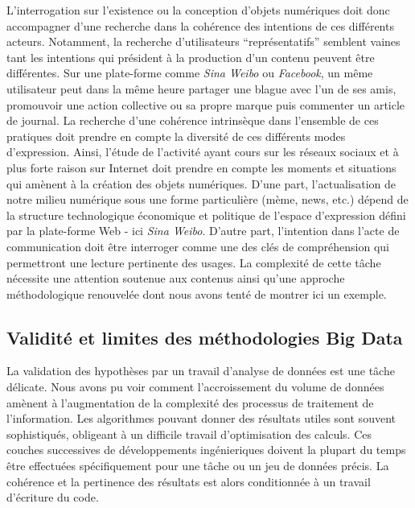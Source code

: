 L'interrogation sur l'existence ou la conception d'objets numériques doit donc accompagner d'une recherche dans la cohérence des intentions de ces différents acteurs. Notamment, la recherche d'utilisateurs ``représentatifs'' semblent vaines tant les intentions qui président à la production d'un contenu peuvent être différentes. Sur une plate-forme comme \textit{Sina Weibo} ou \textit{Facebook}, un même utilisateur peut dans la même heure partager une blague avec l'un de ses amis, promouvoir une action collective ou sa propre marque puis commenter un article de journal. La recherche d'une cohérence intrinsèque dans l'ensemble de ces pratiques doit prendre en compte la diversité de ces différents modes d'expression. Ainsi, l'étude de l'activité ayant cours sur les réseaux sociaux et à plus forte raison sur Internet doit prendre en compte les moments et situations qui amènent à la création des objets numériques. D'une part, l'actualisation de notre milieu numérique sous une forme particulière (mème, news, etc.) dépend de la structure technologique économique et politique de l'espace d'expression défini par la plate-forme Web - ici \textit{Sina Weibo}. D'autre part, l'intention dans l'acte de communication doit être interroger comme une des clés de compréhension qui permettront une lecture pertinente des usages. La complexité de cette tâche nécessite une attention soutenue aux contenus ainsi qu'une approche méthodologique renouvelée dont nous avons tenté de montrer ici un exemple.


\subsection[Validité et limites des méthodologies Big Data]{Validité et limites des méthodologies Big Data}


La validation des hypothèses par un travail d'analyse de données est une tâche délicate. Nous avons pu voir comment l'accroissement du volume de données amènent à l'augmentation de la complexité des processus de traitement de l'information. Les algorithmes pouvant donner des résultats utiles sont souvent sophistiqués, obligeant à un difficile travail d'optimisation des calculs. Ces couches successives de développements ingénieriques doivent la plupart du temps être effectuées spécifiquement pour une tâche ou un jeu de données précis. La cohérence et la pertinence des résultats est alors conditionnée à un travail d'écriture du code. 

